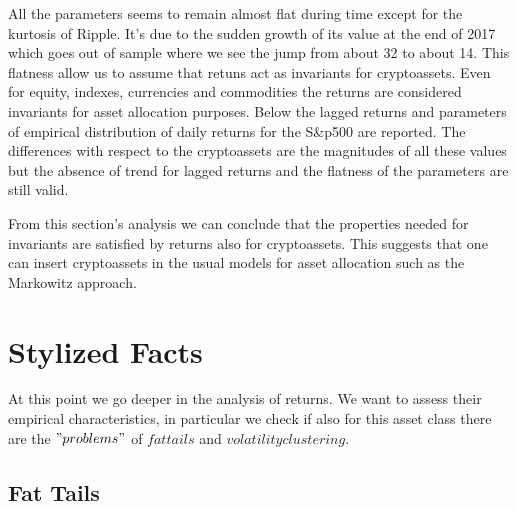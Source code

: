 All the parameters seems to remain almost flat during time except for the kurtosis of Ripple. It's due to the sudden growth of its value at the end of 2017 which goes out of sample where we see the jump from about 32 to about 14.
This flatness allow us to assume that retuns act as invariants for cryptoassets. Even for equity, indexes, currencies and commodities the returns are considered invariants for asset allocation purposes. Below the lagged returns and parameters of empirical distribution of daily returns for the S\&p500 are reported. The differences with respect to the cryptoassets are the magnitudes of all these values but the absence of trend for lagged returns and the flatness of the parameters are still valid.

\begin{table}[H]
    \centering
    \label{tab:my_label}
\end{table}
\bigskip



From this section's analysis we can conclude that the properties needed for invariants are satisfied by returns also for cryptoassets. This suggests that one can insert cryptoassets in the usual models for asset allocation such as the Markowitz approach.

\section{Stylized Facts}
At this point we go deeper in the analysis of returns. We want to assess their empirical characteristics, in particular we check if also for this asset class there are the $"problems"$ of $fat tails$ and $volatility clustering$.

\subsection{Fat Tails}


